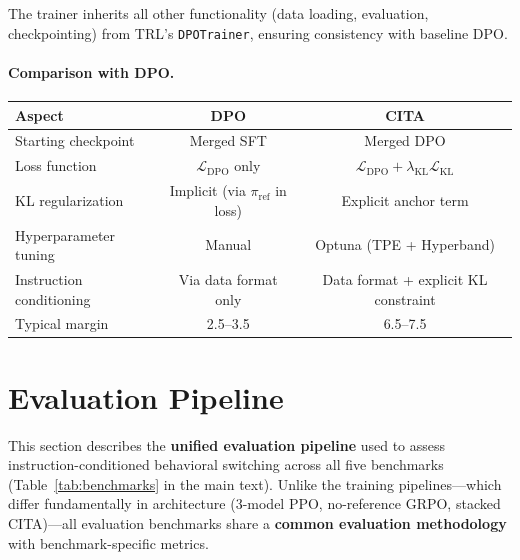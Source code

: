 The trainer inherits all other functionality (data loading, evaluation, checkpointing) from TRL's \texttt{DPOTrainer}, ensuring consistency with baseline DPO.

\paragraph{Comparison with DPO.}
\begin{center}
\begin{tabular}{lcc}
\toprule
\textbf{Aspect} & \textbf{DPO} & \textbf{CITA} \\
\midrule
Starting checkpoint & Merged SFT & Merged DPO \\
Loss function & $\mathcal{L}_{\text{DPO}}$ only & $\mathcal{L}_{\text{DPO}} + \lambda_{\text{KL}} \mathcal{L}_{\text{KL}}$ \\
KL regularization & Implicit (via $\pi_{\text{ref}}$ in loss) & Explicit anchor term \\
Hyperparameter tuning & Manual & Optuna (TPE + Hyperband) \\
Instruction conditioning & Via data format only & Data format + explicit KL constraint \\
Typical margin & 2.5--3.5 & 6.5--7.5 \\
\bottomrule
\end{tabular}
\end{center}

\newpage
\section{Evaluation Pipeline}
\label{sec:appendix_evaluation_pipeline}

This section describes the \textbf{unified evaluation pipeline} used to assess instruction-conditioned behavioral switching across all five benchmarks (Table~\ref{tab:benchmarks} in the main text). Unlike the training pipelines---which differ fundamentally in architecture (3-model PPO, no-reference GRPO, stacked CITA)---all evaluation benchmarks share a \textbf{common evaluation methodology} with benchmark-specific metrics.

